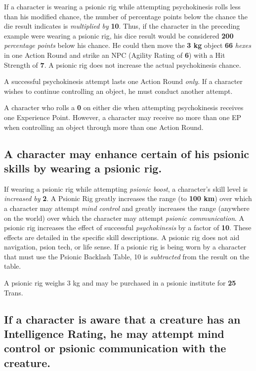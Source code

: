 If a character is wearing a psionic rig while attempting psychokinesis
rolls less than his modified chance, the number of percentage points
below the chance the die result indicates is \emph{multiplied by}
\textbf{10}.  Thus, if the character in the preceding example were
wearing a psionic rig, his dice result would be considered
\textbf{200} \emph{percentage points} below his chance.  He could then
move the \textbf{3 kg} object \textbf{66} \emph{hexes} in one Action
Round and strike an NPC (Agility Rating of \textbf{6}) with a Hit
Strength of \textbf{7}.
A psionic rig does not increase the actual psychokinesis chance.

A successful psychokinesis attempt lasts one Action Round \emph{only}.
If a character wishes to continue controlling an object, he must
conduct another attempt.

A character who rolls a \textbf{0} on either die when attempting
psychokinesis receives one Experience Point.  However, a character may
receive no more than one EP when controlling an object through more
than one Action Round.

\subsection[Psionic Rig]{A character may enhance certain of his
  psionic skills by wearing a \hypertarget{tag:psionic-rig}{psionic rig}.}
\label{sec:psionicrig}

If wearing a psionic rig while attempting \emph{psionic boost}, a
character's skill level is \emph{increased by} \textbf{2}.  A Psionic
Rig greatly increases the range (to \textbf{100 km}) over which a
character may attempt \emph{mind control} and greatly increases the
range (anywhere on the world) over which the character may attempt
\emph{psionic communication}.  A psionic rig increases the effect of
successful \emph{psychokinesis} by a factor of \textbf{10}.  These
effects are detailed in the specific skill descriptions.  A psionic rig
does not aid navigation, psion tech, or life sense.  If a psionic rig
is being worn by a character that must use the Psionic Backlash Table,
10 is \emph{subtracted} from the result on the table.

A psionic rig weighs 3 kg and may be purchased in a psionic institute
for \textbf{25} Trans.

\subsection[Psionic Skills and Creatures]{If a character is aware that
  a creature has an Intelligence Rating, he may attempt mind control
  or  psionic communication with the creature.}
\label{sec:psicreatures}

